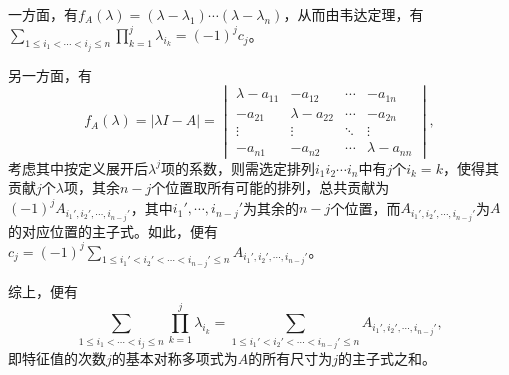 \documentclass[10pt,twocolumn,letterpaper]{article}
\theoremstyle{mythmstyle}
\begin{document}
一方面，有$f_A(\lambda)=(\lambda-\lambda_1)\cdots(\lambda-\lambda_n)$，从而由韦达定理，有$\sum_{1\leq i_1<\cdots<i_j\leq n}\prod_{k=1}^j\lambda_{i_k}=(-1)^jc_j$。

另一方面，有
\[f_A(\lambda)=|\lambda I-A|=\begin{vmatrix}
\lambda-a_{11} & -a_{12} & \cdots & -a_{1n} \\
-a_{21} & \lambda-a_{22} & \cdots & -a_{2n} \\
\vdots & \vdots & \ddots & \vdots \\
-a_{n1} & -a_{n2} & \cdots & \lambda-a_{nn}
\end{vmatrix},\]
考虑其中按定义展开后$\lambda^j$项的系数，则需选定排列$i_1i_2\cdots i_n$中有$j$个$i_k=k$，使得其贡献$j$个$\lambda$项，其余$n-j$个位置取所有可能的排列，总共贡献为$(-1)^j A_{i_1',i_2',\cdots,i_{n-j}'}$，其中$i_1',\cdots,i_{n-j}'$为其余的$n-j$个位置，而$A_{i_1',i_2',\cdots,i_{n-j}'}$为$A$的对应位置的主子式。如此，便有$c_j=(-1)^j\sum_{1\leq i_1'<i_2'<\cdots<i_{n-j}'\leq n}A_{i_1',i_2',\cdots,i_{n-j}'}$。

综上，便有
\[\sum_{1\leq i_1<\cdots<i_j\leq n}\prod_{k=1}^j\lambda_{i_k}=\sum_{1\leq i_1'<i_2'<\cdots<i_{n-j}'\leq n}A_{i_1',i_2',\cdots,i_{n-j}'},\]
即特征值的次数$j$的基本对称多项式为$A$的所有尺寸为$j$的主子式之和。
\end{document}

